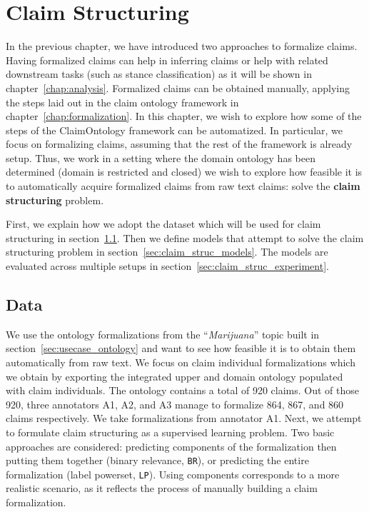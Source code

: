 \chapter{Claim Structuring}
\label{chap:claim_structuring}

In the previous chapter, we have introduced two approaches to formalize 
claims.  Having formalized claims can help in inferring claims
or help with related downstream tasks (such as stance classification) as it
will be shown in chapter~\ref{chap:analysis}.
Formalized claims can be obtained manually, applying the steps laid out in the 
claim ontology framework in chapter~\ref{chap:formalization}. 
In this chapter, we wish to explore how some of the steps of the ClaimOntology
framework can be automatized. 
In particular, we focus on formalizing 
claims, assuming that the rest of the framework is already setup. 
Thus, we work in a setting where the domain ontology has been determined (domain is
restricted and closed) we wish to explore how feasible it is to automatically
acquire formalized claims from raw text claims: solve the \textbf{claim structuring}
problem.

First, we explain how we adopt the dataset which will be used for claim
structuring in section~\ref{sec:claim_struc_data}.  Then we define models that
attempt to solve the claim structuring problem in
section~\ref{sec:claim_struc_models}.  The models are evaluated across multiple
setups in section~\ref{sec:claim_struc_experiment}.  

\section{Data}
\label{sec:claim_struc_data}

We use the ontology formalizations from the 
``\emph{Marijuana}'' topic built in section~\ref{sec:usecase_ontology} and 
want to see how feasible it is to obtain them automatically from raw text.
We focus on claim individual formalizations which we obtain by exporting
the integrated upper and domain ontology populated with claim individuals. 
The ontology contains a total of 920 claims. Out of those 920, three annotators 
A1, A2, and A3 manage to formalize 864, 867, and 860 claims respectively.
We take formalizations from annotator A1. 
Next, we attempt to formulate claim structuring as a supervised learning
problem.  Two basic approaches are considered: predicting components of the
formalization then putting them together (binary relevance, \texttt{BR}), or
predicting the entire formalization (label powerset, \texttt{LP}). 
Using components corresponds to a more realistic scenario, as it reflects 
the process of manually building a claim formalization. 

